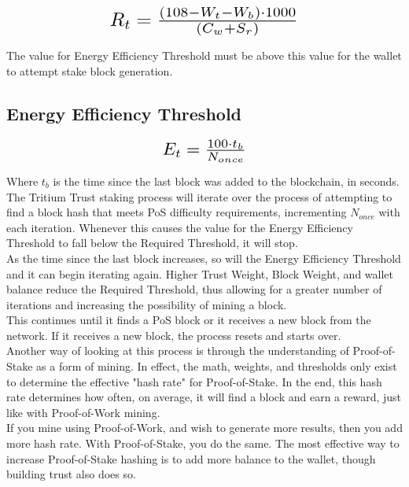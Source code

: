\documentclass[11pt]{article}
\begin{document}
\begin{equation}
\resizebox{.5\hsize}{!}{$R_{t} = \frac{(108 - W_{t} - W_{b}) \cdot 1000}{(C_{w} + S_{r})}$}
\end{equation}


\noindent The value for Energy Efficiency Threshold must be above this value for the wallet to attempt stake block generation.\\


\subsection{Energy Efficiency Threshold}

\begin{equation}
\resizebox{.22\hsize}{!}{$E_{t} = \frac{100 \cdot t_{b}}{N_{once}}$}
\end{equation}

\noindent Where $t_{b}$ is the time since the last block was added to the blockchain, in seconds.\\

\noindent The Tritium Trust staking process will iterate over the process of attempting to find a block hash that meets PoS difficulty requirements, incrementing $N_{once}$ with each iteration. Whenever this causes the value for the Energy Efficiency Threshold to fall below the Required Threshold, it will stop.\\

\noindent As the time since the last block increases, so will the Energy Efficiency Threshold and it can begin iterating again. Higher Trust Weight, Block Weight, and wallet balance reduce the Required Threshold, thus allowing for a greater number of iterations and increasing the possibility of mining a block.\\

\noindent This continues until it finds a PoS block or it receives a new block from the network. If it receives a new block, the process resets and starts over.\\

\noindent Another way of looking at this process is through the understanding of Proof-of-Stake as a form of mining. In effect, the math, weights, and thresholds only exist to determine the effective "hash rate" for Proof-of-Stake. In the end, this hash rate determines how often, on average, it will find a block and earn a reward, just like with Proof-of-Work mining.\\

\noindent If you mine using Proof-of-Work, and wish to generate more results, then you add more hash rate. With Proof-of-Stake, you do the same. The most effective way to increase Proof-of-Stake hashing is to add more balance to the wallet, though building trust also does so. \\
\end{document}
